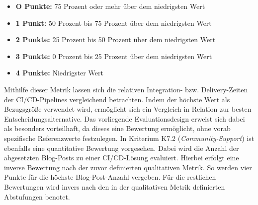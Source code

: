 \begin{itemize}
	\setlength{\itemsep}{0pt}
	\item \textbf{O Punkte:} 75 Prozent oder mehr über dem niedrigsten Wert 
	\item \textbf{1 Punkt:} 50 Prozent bis 75 Prozent über dem niedrigsten Wert
	\item \textbf{2 Punkte:} 25 Prozent bis 50 Prozent über dem niedrigsten Wert
	\item \textbf{3 Punkte:} 0 Prozent bis 25 Prozent über dem niedrigsten Wert
	\item \textbf{4 Punkte:} Niedrigster Wert
  \end{itemize}
Mithilfe dieser Metrik lassen sich die relativen Integration- bzw. Delivery-Zeiten der CI/CD-Pipelines vergleichend betrachten. Indem der höchste Wert als Bezugsgröße verwendet wird, ermöglicht sich ein Vergleich in Relation zur besten Entscheidungsalternative. Das vorliegende Evaluationsdesign erweist sich dabei als besonders vorteilhaft, da dieses eine Bewertung ermöglicht, ohne vorab spezifische Referenzwerte festzulegen. In Kriterium K7.2 (\textit{Community-Support}) ist ebenfalls eine quantitative Bewertung vorgesehen. Dabei wird die Anzahl der abgesetzten Blog-Posts zu einer CI/CD-Lösung evaluiert. Hierbei erfolgt eine inverse Bewertung nach der zuvor definierten qualitativen Metrik. So werden vier Punkte für die höchste Blog-Post-Anzahl vergeben. Für die restlichen Bewertungen wird invers nach den in der qualitativen Metrik definierten Abstufungen benotet. 

